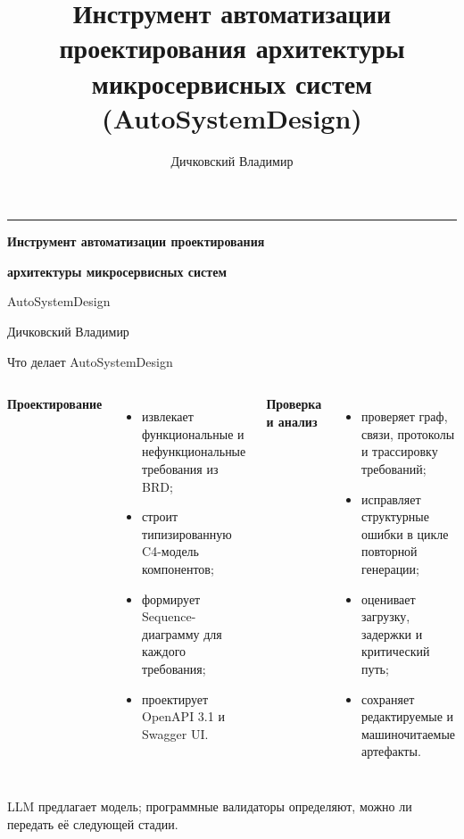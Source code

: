 \documentclass[aspectratio=169,10pt]{beamer}
\title[AutoSystemDesign]{Инструмент автоматизации проектирования архитектуры микросервисных систем (AutoSystemDesign)}
\author[Дичковский]{Дичковский Владимир}
\date{}
\newcommand{\muted}[1]{{\color{Muted}\footnotesize #1}}
\begin{document}
\begin{frame}[plain]
  \vfill
  {\color{Accent}\rule{0.12\textwidth}{2pt}\par}\vspace{0.42cm}
  {\LARGE\bfseries Инструмент автоматизации проектирования\par}\vspace{0.12cm}
  {\Large\bfseries архитектуры микросервисных систем\par}\vspace{0.25cm}
  {\large AutoSystemDesign\par}\vspace{0.8cm}
  {\normalsize Дичковский Владимир\par}
  \vfill
\end{frame}

\begin{frame}{Что делает AutoSystemDesign}
  \begin{columns}[T,onlytextwidth]
      \textbf{Проектирование}
      \begin{itemize}
        \item извлекает функциональные и нефункциональные требования из BRD;
        \item строит типизированную C4-модель компонентов;
        \item формирует Sequence-диаграмму для каждого требования;
        \item проектирует OpenAPI 3.1 и Swagger UI.
      \end{itemize}
      \textbf{Проверка и анализ}
      \begin{itemize}
        \item проверяет граф, связи, протоколы и трассировку требований;
        \item исправляет структурные ошибки в цикле повторной генерации;
        \item оценивает загрузку, задержки и критический путь;
        \item сохраняет редактируемые и машиночитаемые артефакты.
      \end{itemize}
  \end{columns}
  \vfill
  \muted{LLM предлагает модель; программные валидаторы определяют, можно ли передать её следующей стадии.}
\end{frame}
\end{document}
